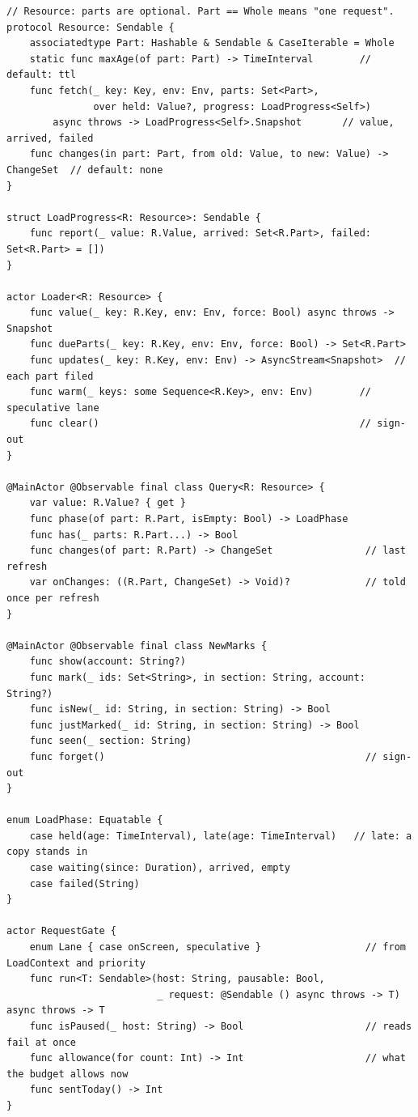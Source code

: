 \begin{lstlisting}
// Resource: parts are optional. Part == Whole means "one request".
protocol Resource: Sendable {
    associatedtype Part: Hashable & Sendable & CaseIterable = Whole
    static func maxAge(of part: Part) -> TimeInterval        // default: ttl
    func fetch(_ key: Key, env: Env, parts: Set<Part>,
               over held: Value?, progress: LoadProgress<Self>)
        async throws -> LoadProgress<Self>.Snapshot       // value, arrived, failed
    func changes(in part: Part, from old: Value, to new: Value) -> ChangeSet  // default: none
}

struct LoadProgress<R: Resource>: Sendable {
    func report(_ value: R.Value, arrived: Set<R.Part>, failed: Set<R.Part> = [])
}

actor Loader<R: Resource> {
    func value(_ key: R.Key, env: Env, force: Bool) async throws -> Snapshot
    func dueParts(_ key: R.Key, env: Env, force: Bool) -> Set<R.Part>
    func updates(_ key: R.Key, env: Env) -> AsyncStream<Snapshot>  // each part filed
    func warm(_ keys: some Sequence<R.Key>, env: Env)        // speculative lane
    func clear()                                             // sign-out
}

@MainActor @Observable final class Query<R: Resource> {
    var value: R.Value? { get }
    func phase(of part: R.Part, isEmpty: Bool) -> LoadPhase
    func has(_ parts: R.Part...) -> Bool
    func changes(of part: R.Part) -> ChangeSet                // last refresh
    var onChanges: ((R.Part, ChangeSet) -> Void)?             // told once per refresh
}

@MainActor @Observable final class NewMarks {
    func show(account: String?)
    func mark(_ ids: Set<String>, in section: String, account: String?)
    func isNew(_ id: String, in section: String) -> Bool
    func justMarked(_ id: String, in section: String) -> Bool
    func seen(_ section: String)
    func forget()                                             // sign-out
}

enum LoadPhase: Equatable {
    case held(age: TimeInterval), late(age: TimeInterval)   // late: a copy stands in
    case waiting(since: Duration), arrived, empty
    case failed(String)
}

actor RequestGate {
    enum Lane { case onScreen, speculative }                  // from LoadContext and priority
    func run<T: Sendable>(host: String, pausable: Bool,
                          _ request: @Sendable () async throws -> T) async throws -> T
    func isPaused(_ host: String) -> Bool                     // reads fail at once
    func allowance(for count: Int) -> Int                     // what the budget allows now
    func sentToday() -> Int
}


\end{lstlisting}
